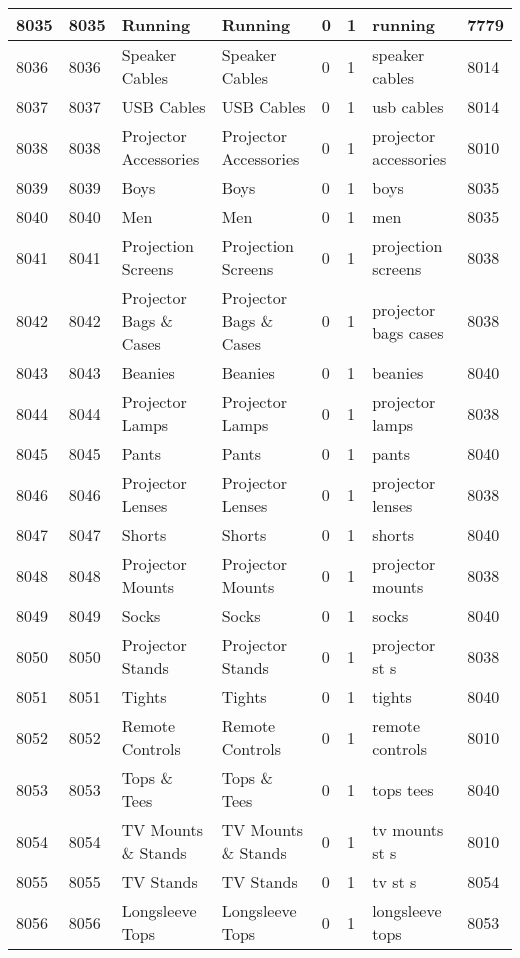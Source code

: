 \begin{longtable}{|l|l|l|l|l|l|l|l|}
8035 & 8035 & Running & Running & 0 & 1 & running & 7779 \\ \hline 
8036 & 8036 & Speaker Cables & Speaker Cables & 0 & 1 & speaker cables & 8014 \\ \hline 
8037 & 8037 & USB Cables & USB Cables & 0 & 1 & usb cables & 8014 \\ \hline 
8038 & 8038 & Projector Accessories & Projector Accessories & 0 & 1 & projector accessories & 8010 \\ \hline 
8039 & 8039 & Boys & Boys & 0 & 1 & boys & 8035 \\ \hline 
8040 & 8040 & Men & Men & 0 & 1 & men & 8035 \\ \hline 
8041 & 8041 & Projection Screens & Projection Screens & 0 & 1 & projection screens & 8038 \\ \hline 
8042 & 8042 & Projector Bags \& Cases & Projector Bags \& Cases & 0 & 1 & projector bags cases & 8038 \\ \hline 
8043 & 8043 & Beanies & Beanies & 0 & 1 & beanies & 8040 \\ \hline 
8044 & 8044 & Projector Lamps & Projector Lamps & 0 & 1 & projector lamps & 8038 \\ \hline 
8045 & 8045 & Pants & Pants & 0 & 1 & pants & 8040 \\ \hline 
8046 & 8046 & Projector Lenses & Projector Lenses & 0 & 1 & projector lenses & 8038 \\ \hline 
8047 & 8047 & Shorts & Shorts & 0 & 1 & shorts & 8040 \\ \hline 
8048 & 8048 & Projector Mounts & Projector Mounts & 0 & 1 & projector mounts & 8038 \\ \hline 
8049 & 8049 & Socks & Socks & 0 & 1 & socks & 8040 \\ \hline 
8050 & 8050 & Projector Stands & Projector Stands & 0 & 1 & projector st s & 8038 \\ \hline 
8051 & 8051 & Tights & Tights & 0 & 1 & tights & 8040 \\ \hline 
8052 & 8052 & Remote Controls & Remote Controls & 0 & 1 & remote controls & 8010 \\ \hline 
8053 & 8053 & Tops \& Tees & Tops \& Tees & 0 & 1 & tops tees & 8040 \\ \hline 
8054 & 8054 & TV Mounts \& Stands & TV Mounts \& Stands & 0 & 1 & tv mounts st s & 8010 \\ \hline 
8055 & 8055 & TV Stands & TV Stands & 0 & 1 & tv st s & 8054 \\ \hline 
8056 & 8056 & Longsleeve Tops & Longsleeve Tops & 0 & 1 & longsleeve tops & 8053 \\ \hline 

\end{longtable}
